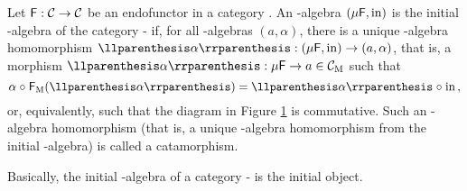 \begin{definition}%
  \label{def:initial-algebra}


  Let $\mathsf{F}: \mathcal{C} \to \mathcal{C}$ be an endofunctor in a category
  . An -algebra $(\mu\mathsf{F},\operatorname{in})$ is the
  initial -algebra of the category -\alg
  if, for all -algebras $(a,\alpha)$, there is a unique
  -algebra homomorphism $\cata\alpha: (\mu\func{F},\inmo) \to
  (a,\alpha)$, that is, a morphism $\cata\alpha: \mu\func{F} \to a \in
  \catM{C}$ such that
  \begin{equation}
    \label{eq:cata-charn}
    \alpha \comp \funcM{F}(\cata\alpha) = \cata\alpha \comp \inmo
    \text{,}
  \end{equation}
  or, equivalently, such that the diagram in Figure
  \ref{fig:cata-charn} is commutative. Such an -algebra
  homomorphism (that is, a unique -algebra homomorphism from
  the initial -algebra) is called a catamorphism.
  \begin{figure}[htbp]
    \begin{center}
    \end{center}
    \caption{}
    \label{fig:cata-charn}
  \end{figure}

  Basically, the initial -algebra of a category -\alg
  is the initial object.

\end{definition}


